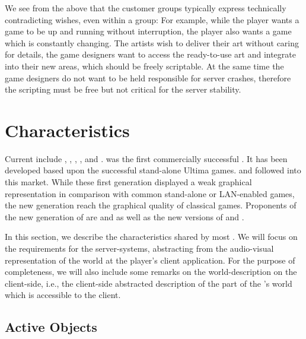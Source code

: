 \documentclass[a4paper, 10pt]{book}
\begin{document}
We see from the above that the customer groups typically express 
technically contradicting wishes, even within a group:
For example, while the player wants a game to be up and running without
interruption, the player also wants a game which is constantly
changing. The artists wish to deliver their art without caring for
details, the game designers want to access the ready-to-use art and
integrate into their new areas, which should be freely scriptable. At
the same time the game designers do not want to be held responsible
for server crashes, therefore the scripting must be free but not
critical for the server stability.

%
%


\section{\MMORG Characteristics}
\label{sec:The-MMORG-Environment}

Current \MMORGS include \ULTIMA, \EVERQUEST, \ASHERON, \ANARCHY,
\DARKAGE and \EARTH. \ULTIMA was the first commercially successful
\MMORG. It has been developed based upon the successful stand-alone
Ultima games.  \EVERQUEST and \ASHERON followed \ULTIMA into this
market.  While these first generation \MMORGS displayed a weak
graphical representation in comparison with common stand-alone or
LAN-enabled games, the new generation \MMORGS reach the graphical
quality of classical games. Proponents of the new generation of
\MMORGS are \DARKAGE and \EARTH as well as the new versions of
\EVERQUEST and \ASHERON.

In this section, we describe the characteristics shared by most
\MMORGS. We will focus on the requirements for the server-systems,
abstracting from the audio-visual representation of the world at the player's
client application. For the purpose of completeness, we will also
include some remarks on the world-description on the client-side,
i.e., the client-side abstracted description of the part of the
\MMORG's world which is accessible to the client. 

\subsection{Active Objects} 
\label{sec:active-objects}
\end{document}

